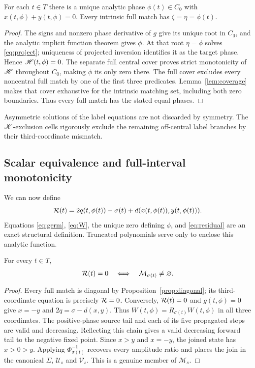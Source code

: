 \begin{proposition}\label{prop:diagonal}
For each \(t\in T\) there is a unique analytic phase
\(\phi(t)\in C_0\) with \(x(t,\phi)+y(t,\phi)=0\).
Every intrinsic full match has
\(\zeta=\eta=\phi(t)\).
\end{proposition}
\begin{proof}
The signs and nonzero phase derivative of \(g\) give its unique root in
\(C_0\), and the analytic implicit function theorem gives \(\phi\).
At that root \(\eta=\phi\) solves \eqref{eq:project}; uniqueness of
projected inversion identifies it as the target phase. Hence
\(\mathscr H(t,\phi)=0\). The separate full central cover proves strict
monotonicity of \(\mathscr H\) throughout \(C_0\), making \(\phi\) its only zero
there. The full cover excludes every noncentral full match by one of
the first three predicates. Lemma~\ref{lem:coverage} makes that cover
exhaustive for the intrinsic matching set, including both zero boundaries.
Thus every full match has the stated equal phases.
\end{proof}
Asymmetric solutions of the label equations are not discarded by
symmetry. The \(\mathscr K\)-exclusion cells rigorously exclude the remaining
off-central label branches by their third-coordinate mismatch.

\subsection{Scalar equivalence and full-interval monotonicity}
We can now define
\begin{equation}\label{eq:residual}
 \mathcal R(t)=2q(t,\phi(t))-\sigma(t)
           +d(x(t,\phi(t)),y(t,\phi(t))).
\end{equation}
Equations \eqref{eq:germ}, \eqref{eq:W}, the unique zero defining
\(\phi\), and \eqref{eq:residual} are an exact structural definition.
Truncated polynomials serve only to enclose this analytic function.

\begin{proposition}\label{prop:scalar}
For every \(t\in T\),
\[
 \mathcal R(t)=0\quad\Longleftrightarrow\quad
 \mathcal M_{\sigma(t)}\ne\varnothing .
\]
\end{proposition}
\begin{proof}
Every full match is diagonal by Proposition~\ref{prop:diagonal}; its
third-coordinate equation is precisely \(\mathcal R=0\).
Conversely, \(\mathcal R(t)=0\) and \(g(t,\phi)=0\) give
\(x=-y\) and \(2q=\sigma-d(x,y)\). Thus \(W(t,\phi)=R_{\sigma(t)}W(t,\phi)\)
in all three coordinates. The positive-phase source tail and each of its
five propagated steps are valid and decreasing. Reflecting this chain
gives a valid decreasing forward tail to the negative fixed point.
Since \(x>y\) and \(x=-y\), the joined state has \(x>0>y\).
Applying \(\Phi_{\sigma(t)}^{-1}\) recovers every amplitude ratio and
places the join in the canonical \(\Sigma\), \(\mathcal U_s\) and
\(\mathcal V_s\). This is a genuine member of \(\mathcal M_s\).
\end{proof}

